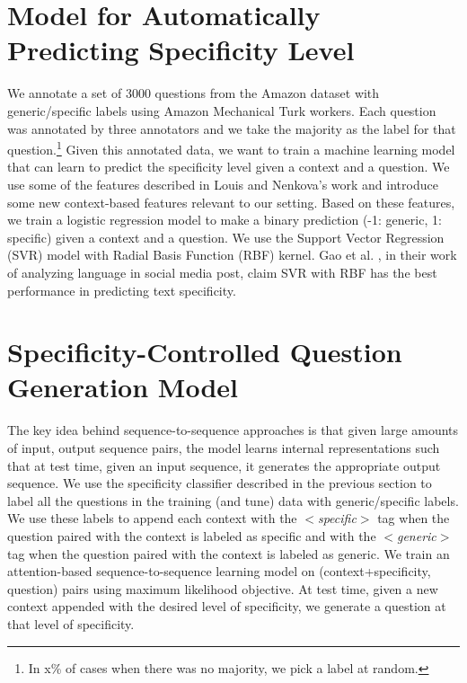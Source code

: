 \documentclass[11pt]{article}
\begin{document}
\section{Model for Automatically Predicting Specificity Level}\label{classifier}

We annotate a set of 3000 questions from the Amazon dataset \cite{rao2019answer} with generic/specific labels using Amazon Mechanical Turk workers. Each question was annotated by three annotators and we take the majority as the label for that question.\footnote{In x\% of cases when there was no majority, we pick a label at random.} 
Given this annotated data, we want to train a machine learning model that can learn to predict the specificity level given a context and a question. We use some of the features described in Louis and Nenkova's work \cite{louis2011automatic} and introduce some new context-based features relevant to our setting. Based on these features, we train a logistic regression model to make a binary prediction (-1: generic, 1: specific) given a context and a question. We use the Support Vector Regression (SVR) model with Radial Basis Function (RBF) kernel. Gao et al. , in their work of analyzing language in social media post, claim SVR with RBF has the best performance in predicting text specificity.


\section{Specificity-Controlled Question Generation Model}\label{model}
The key idea behind sequence-to-sequence approaches is that given large amounts of input, output sequence pairs, the model learns internal representations such that at test time, given an input sequence, it generates the appropriate output sequence. 
We use the specificity classifier described in the previous section to label all the questions in the training (and tune) data with generic/specific labels. 
We use these labels to append each context with the \textit{$<$specific$>$} tag when the question paired with the context is labeled as specific and with the \textit{$<$generic$>$} tag when the question paired with the context is labeled as generic.
We train an attention-based sequence-to-sequence learning model \cite{luong2015effective} on (context+specificity, question) pairs using maximum likelihood objective. 
At test time, given a new context appended with the desired level of specificity, we generate a question at that level of specificity.
\end{document}
